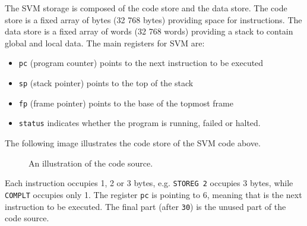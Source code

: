 \documentclass[a4paper, openany]{memoir}
\begin{document}
The SVM storage is composed of the code store and the data store. The code store is a fixed array of bytes (32 768 bytes) providing space for instructions. The data store is a fixed array of words (32 768 words) providing a stack to contain global and local data. The main registers for SVM are:
\begin{itemize}
    \item \texttt{pc} (program counter) points to the next instruction to be executed
    \item \texttt{sp} (stack pointer) points to the top of the stack
    \item \texttt{fp} (frame pointer) points to the base of the topmost frame
    \item \texttt{status} indicates whether the program is running, failed or halted.
\end{itemize}

The following image illustrates the code store of the SVM code above.
\begin{figure}[H]
    \centering
    \caption{An illustration of the code source.}
\end{figure}
\noindent Each instruction occupies 1, 2 or 3 bytes, e.g. \texttt{STOREG 2} occupies 3 bytes, while \texttt{COMPLT} occupies only 1. The register \texttt{pc} is pointing to 6, meaning that is the next instruction to be executed. The final part (after \texttt{30}) is the unused part of the code source.
\end{document}
